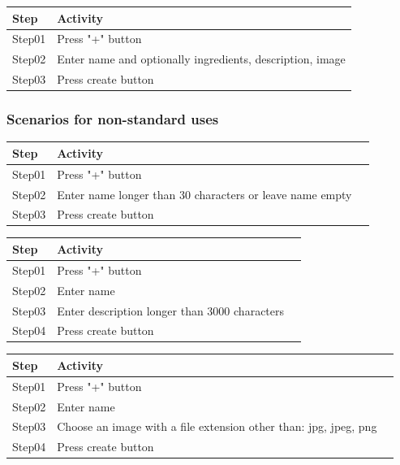 \documentclass[12pt]{article}
\theoremstyle{definition}
\begin{document}
\begin{tabular}{|l|l|}
\hline
Step & Activity \\ \hline
Step01 & Press "+" button\\ \hline
Step02 & Enter name and optionally ingredients, description, image\\ \hline
Step03 & Press create button \\ \hline
\end{tabular}

\subsubsection{Scenarios for non-standard uses}

\begin{tabular}{|l|l|l|}
\hline
Step & Activity \\ \hline
Step01 & Press "+" button \\ \hline
Step02 & Enter name longer than 30 characters or leave name empty \\ \hline
Step03 & Press create button \\ \hline
\end{tabular}

\vspace*{1 cm}
\begin{flushleft}
\begin{tabular}{|l|l|l|}
\hline
Step & Activity \\ \hline
Step01 & Press "+" button \\ \hline
Step02 & Enter name  \\ \hline
Step03 & Enter description longer than 3000 characters\\ \hline
Step04 & Press create button \\ \hline
\end{tabular}
\end{flushleft}

\vspace*{1 cm}
\begin{flushleft}
\begin{tabular}{|l|l|l|}
\hline
Step & Activity \\ \hline
Step01 & Press "+" button \\ \hline
Step02 & Enter name  \\ \hline
Step03 & Choose an image with a file extension other than: jpg, jpeg, png\\ \hline
Step04 & Press create button \\ \hline
\end{tabular}
\end{flushleft}
\end{document}
